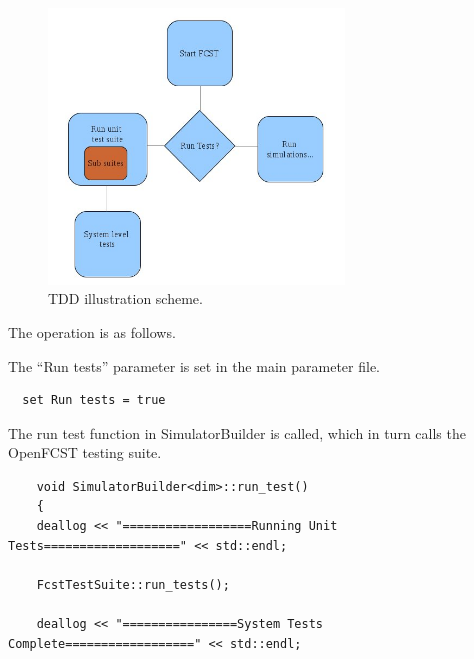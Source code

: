 \FloatBarrier
\begin{figure}[h]
\begin{center}
\includegraphics[width=0.7\textwidth]{figures/FCST_TDD.jpeg}
\caption{\label{fcstUnit} TDD illustration scheme.}
\end{center}
\end{figure}
\FloatBarrier

The operation is as follows.

The ``Run tests'' parameter is set in the main parameter file.

\begin{center}
\begin{lstlisting}
  set Run tests = true
\end{lstlisting}
\end{center}

The run test function in SimulatorBuilder is called, which in turn calls the OpenFCST testing suite.

\begin{center}
  \begin{lstlisting}
    void SimulatorBuilder<dim>::run_test()
    {	
	deallog << "==================Running Unit Tests===================" << std::endl;

	FcstTestSuite::run_tests();
	
	deallog << "================System Tests Complete==================" << std::endl;
  \end{lstlisting}
\end{center}

